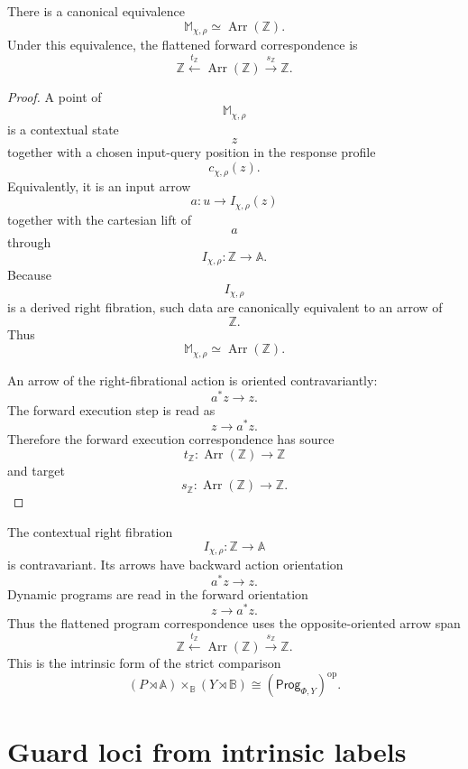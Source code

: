 \begin{theorem}
\label{thm:derived-poly-flattening-arrow-object}
There is a canonical equivalence
\[
\mathbb M_{\chi,\rho}
\simeq
\operatorname{Arr}(\mathbb Z).
\]
Under this equivalence, the flattened forward correspondence is
\[
\mathbb Z
\xleftarrow{t_{\mathbb Z}}
\operatorname{Arr}(\mathbb Z)
\xrightarrow{s_{\mathbb Z}}
\mathbb Z.
\]
\end{theorem}

\begin{proof}
A point of
\[
\mathbb M_{\chi,\rho}
\]
is a contextual state
\[
z
\]
together with a chosen input-query position in the response profile
\[
c_{\chi,\rho}(z).
\]
Equivalently, it is an input arrow
\[
a:u\to I_{\chi,\rho}(z)
\]
together with the cartesian lift of
\[
a
\]
through
\[
I_{\chi,\rho}:\mathbb Z\to\mathbb A.
\]
Because
\[
I_{\chi,\rho}
\]
is a derived right fibration, such data are canonically equivalent to an arrow
of
\[
\mathbb Z.
\]
Thus
\[
\mathbb M_{\chi,\rho}
\simeq
\operatorname{Arr}(\mathbb Z).
\]

An arrow of the right-fibrational action is oriented contravariantly:
\[
a^\ast z\to z.
\]
The forward execution step is read as
\[
z\to a^\ast z.
\]
Therefore the forward execution correspondence has source
\[
t_{\mathbb Z}:\operatorname{Arr}(\mathbb Z)\to\mathbb Z
\]
and target
\[
s_{\mathbb Z}:\operatorname{Arr}(\mathbb Z)\to\mathbb Z.
\]
\end{proof}

\begin{remark}[Orientation]
\label{rem:derived-poly-orientation-forward-backward}
The contextual right fibration
\[
I_{\chi,\rho}:\mathbb Z\to\mathbb A
\]
is contravariant.  Its arrows have backward action orientation
\[
a^\ast z\to z.
\]
Dynamic programs are read in the forward orientation
\[
z\to a^\ast z.
\]
Thus the flattened program correspondence uses the opposite-oriented arrow
span
\[
\mathbb Z
\xleftarrow{t_{\mathbb Z}}
\operatorname{Arr}(\mathbb Z)
\xrightarrow{s_{\mathbb Z}}
\mathbb Z.
\]
This is the intrinsic form of the strict comparison
\[
(P\rtimes\mathbb A)\times_{\mathbb B}(Y\rtimes\mathbb B)
\cong
(\mathsf{Prog}_{\Phi,Y})^{\mathrm{op}}.
\]
\end{remark}

\section{Guard loci from intrinsic labels}
\label{sec:derived-poly-guard-loci}


